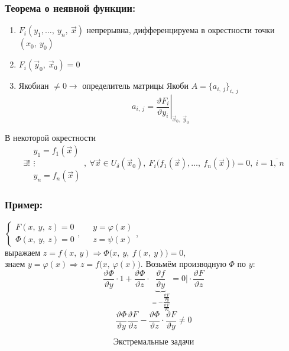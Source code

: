 \documentclass[12pt, letterpaper, twoside]{article}
\begin{document}
    \subsubsection*{Теорема о неявной функции:}
    \begin{enumerate}
        \item $F_i(y_1,\dots,\ y_n,\ \vec{x})$ непрерывна, дифференцируема в окрестности точки $(x_0,\ y_0)$
        \item $F_i(\vec{y}_0,\ \vec{x}_0) = 0$
        \item Якобиан $\neq 0\to$ определитель матрицы Якоби $A = \{a_{i,\ j}\}_{i,\ j}$
        \[a_{i,\ j} = \left.\frac{\vartheta F_i}{\vartheta y_i}\right|_{\vec{x}_0,\ \vec{y}_0 }\]
    \end{enumerate}
    В некоторой окрестности
    \[\exists! \begin{matrix}
        y_1 = f_1(\vec{x})\\
        \vdots\\
        y_n = f_n(\vec{x})
    \end{matrix},\ \forall \vec{x}\in U_{\delta}(\vec{x}_0),\ F_i\big( f_1(\vec{x}),\dots,\ f_n(\vec{x}) \big) = 0,\ i = \overline{1,\ n}\]
    \subsubsection*{Пример:}
    $\begin{cases}
        F(x,\ y,\ z) = 0\\
        \Phi(x,\ y,\ z) = 0
    \end{cases},\quad \begin{matrix}
        y = \varphi(x)\\
        z = \psi(x)
    \end{matrix}$,\\
    выражаем $z = f(x,\ y)\Rightarrow \Phi\big( x,\ y,\ f(x,\ y)\big) = 0$,\\
    знаем $y = \varphi(x)\Rightarrow z = f\big(x,\ \varphi(x)\big)$. Возьмём производную $\Phi$ по $y$:
    \[\frac{\vartheta \Phi}{\vartheta y}\cdot 1 + \frac{\vartheta \Phi}{\vartheta z}\cdot \underset{=-\dfrac{\frac{\vartheta F}{\vartheta y}}{\frac{\vartheta F}{\vartheta z}} }{\underbrace{\frac{\vartheta f}{\vartheta y}}} = 0 \Big|\cdot \frac{\vartheta F}{\vartheta z}\]
    \[\frac{\vartheta \Phi}{\vartheta y}\frac{\vartheta F}{\vartheta z} - \frac{\vartheta \Phi}{\vartheta z}\cdot \frac{\vartheta F}{\vartheta y}\neq 0 \]

\[\textbf{Экстремальные задачи}\]
\end{document}
